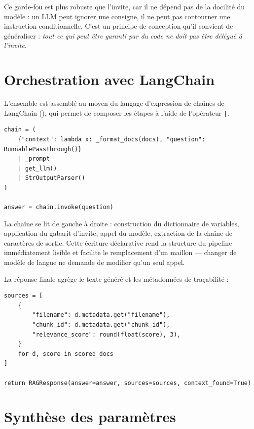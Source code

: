 Ce garde-fou est plus robuste que l'invite, car il ne dépend pas de la
docilité du modèle : un LLM peut ignorer une consigne, il ne peut pas contourner
une instruction conditionnelle. C'est un principe de conception qu'il convient
de généraliser : \emph{tout ce qui peut être garanti par du code ne doit pas être
délégué à l'invite}.

\section{Orchestration avec LangChain}

L'ensemble est assemblé au moyen du langage d'expression de chaînes de LangChain
(), qui permet de composer les étapes à
l'aide de l'opérateur \texttt{|}.

\begin{lstlisting}[style=python,caption={Composition de la chaîne RAG (\texttt{src/rag/pipeline.py})}]
chain = (
    {"context": lambda x: _format_docs(docs), "question": RunnablePassthrough()}
    | _prompt
    | get_llm()
    | StrOutputParser()
)

answer = chain.invoke(question)
\end{lstlisting}

La chaîne se lit de gauche à droite : construction du dictionnaire de variables,
application du gabarit d'invite, appel du modèle, extraction de la chaîne de
caractères de sortie. Cette écriture déclarative rend la structure du pipeline
immédiatement lisible et facilite le remplacement d'un maillon --- changer de
modèle de langue ne demande de modifier qu'un seul appel.

La réponse finale agrège le texte généré et les métadonnées de traçabilité :

\begin{lstlisting}[style=python,caption={Construction de la réponse sourcée}]
sources = [
    {
        "filename": d.metadata.get("filename"),
        "chunk_id": d.metadata.get("chunk_id"),
        "relevance_score": round(float(score), 3),
    }
    for d, score in scored_docs
]

return RAGResponse(answer=answer, sources=sources, context_found=True)
\end{lstlisting}

\section{Synthèse des paramètres}

